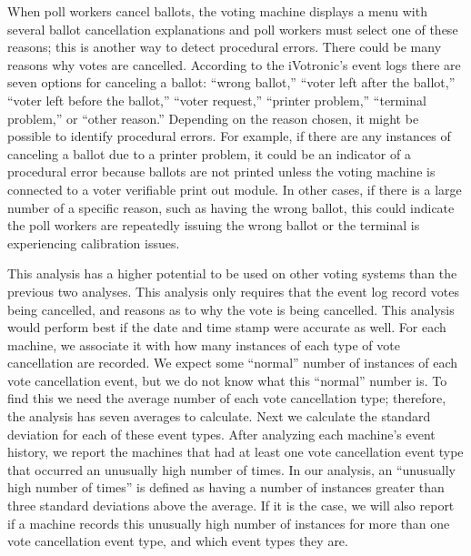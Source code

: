 When poll workers cancel ballots, the voting machine displays a menu with several ballot cancellation explanations and poll workers must select one of these reasons; this is another way to detect procedural errors. There could be many reasons why votes are cancelled. According to the iVotronic’s event logs there are seven options for canceling a ballot: \textquotedblleft wrong ballot,\textquotedblright \hspace{1 mm} \textquotedblleft voter left after the ballot,\textquotedblright \hspace{1 mm}  \textquotedblleft voter left before the ballot,\textquotedblright \hspace{1 mm}  \textquotedblleft voter request,\textquotedblright \hspace{1 mm}  \textquotedblleft printer problem,\textquotedblright \hspace{1 mm}  \textquotedblleft terminal problem,\textquotedblright \hspace{1 mm}  or \textquotedblleft other reason.\textquotedblright \hspace{2 mm}  Depending on the reason chosen, it might be possible to identify procedural errors.  For example, if there are any instances of canceling a ballot due to a printer problem, it could be an indicator of a procedural error because ballots are not printed unless the voting machine is connected to a voter verifiable print out module. In other cases, if there is a large number of a specific reason, such as having the wrong ballot, this could indicate the poll workers are repeatedly issuing the wrong ballot or the terminal is experiencing calibration issues.  

This analysis has a higher potential to be used on other voting systems than the previous two analyses.  This analysis only requires that the event log record votes being cancelled, and reasons as to why the vote is being cancelled.  This analysis would perform best if the date and time stamp were accurate as well.  For each machine, we associate it with how many instances of each type of vote cancellation are recorded.  We expect some \textquotedblleft normal\textquotedblright \hspace{1 mm} number of instances of each vote cancellation event, but we do not know what this \textquotedblleft normal\textquotedblright \hspace{1 mm} number is.  To find this we need the average number of each vote cancellation type; therefore, the analysis has seven averages to calculate.  Next we calculate the standard deviation for each of these event types.  After analyzing each machine's event history, we report the machines that had at least one vote cancellation event type that occurred an unusually high number of times. In our analysis, an \textquotedblleft unusually high number of times\textquotedblright \hspace{1 mm} is defined as having a number of instances greater than three standard deviations above the average.  If it is the case, we will also report if a machine records this unusually high number of instances for more than one vote cancellation event type, and which event types they are.  

